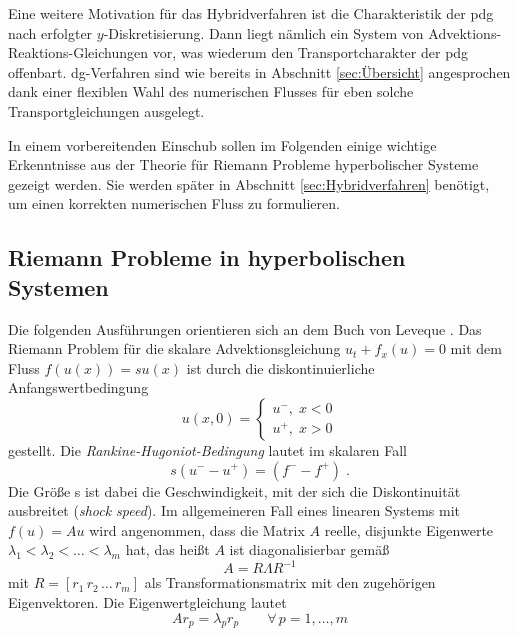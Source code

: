 Eine weitere Motivation für das Hybridverfahren ist die Charakteristik der \ac{pdg} nach erfolgter $y$-Diskretisierung. Dann liegt nämlich ein System von Advektions-Reaktions-Gleichungen vor, was wiederum den Transportcharakter der \ac{pdg} offenbart. \ac{dg}-Verfahren sind wie bereits in Abschnitt \ref{sec:Übersicht} angesprochen dank einer flexiblen Wahl des numerischen Flusses für eben solche Transportgleichungen ausgelegt.

In einem vorbereitenden Einschub sollen im Folgenden einige wichtige Erkenntnisse aus der Theorie für Riemann Probleme hyperbolischer Systeme gezeigt werden. Sie werden später in Abschnitt \ref{sec:Hybridverfahren} benötigt, um einen korrekten numerischen Fluss zu formulieren.

\subsection{Riemann Probleme in hyperbolischen Systemen}\label{sec:riemann}
Die folgenden Ausführungen orientieren sich an dem Buch von Leveque \cite{buchLeveque}.
Das Riemann Problem für die skalare Advektionsgleichung $u_t + f_x(u) = 0$ mit dem Fluss $f(u(x)) = s u(x)$ ist durch die diskontinuierliche Anfangswertbedingung
\begin{equation}
  u(x,0) = \begin{cases} u^- , \; x < 0 \\
                         u^+ , \; x > 0
           \end{cases}
\end{equation}
gestellt.  Die \emph{Rankine-Hugoniot-Bedingung} lautet im skalaren Fall
\begin{equation}
  s(u^- - u^+) = (f^- - f^+) \; .
  \label{eq:rhc}
\end{equation}
Die Größe s ist dabei die Geschwindigkeit, mit der sich die Diskontinuität ausbreitet (\emph{shock speed}). Im allgemeineren Fall eines linearen Systems mit $f(u) = A u$ wird angenommen, dass die Matrix $A$ reelle, disjunkte Eigenwerte $\lambda_1 < \lambda_2 < \dots < \lambda_m$ hat, das heißt $A$ ist diagonalisierbar gemäß
\begin{equation}
  A = R \Lambda R^{-1}
\end{equation}
mit $R=[r_1 \, r_2 \, \dots \, r_m]$ als Transformationsmatrix mit den zugehörigen Eigenvektoren. Die Eigenwertgleichung lautet
\begin{equation}
  Ar_p = \lambda_p r_p \qquad \forall \, p=1,\dots, m
  \label{eq:EWeq_A}
\end{equation}
